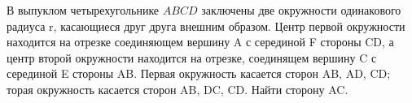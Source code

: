 \documentclass[preview]{standalone}
\begin{document}
\centering В выпуклом четырехугольнике $ABCD$ заключены две окружности одинакового радиуса r, 
                          касающиеся друг друга внешним образом. Центр первой окружности находится на отрезке 
                          соединяющем вершину A с серединой F стороны CD, а центр второй окружности находится 
                          на отрезке, соединящем вершину C с серединой E стороны AB. Первая окружность касается 
                          сторон AB, AD, CD; торая окружность касается сторон AB, DC, CD. Найти сторону AC.
\end{document}
